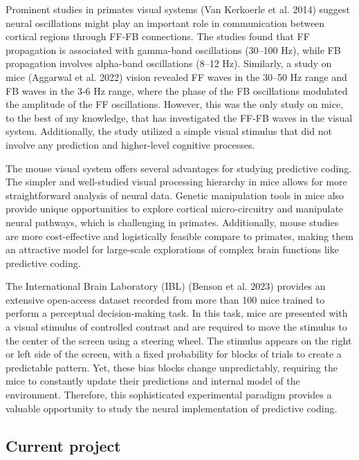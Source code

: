 \documentclass[
  letterpaper,
  DIV=11,
  numbers=noendperiod]{scrartcl}
\begin{document}
Prominent studies in primates visual systems (Van Kerkoerle et al. 2014)
suggest neural oscillations might play an important role in
communication between cortical regions through FF-FB connections. The
studies found that FF propagation is associated with gamma-band
oscillations (30--100 Hz), while FB propagation involves alpha-band
oscillations (8--12 Hz). Similarly, a study on mice (Aggarwal et al.
2022) vision revealed FF waves in the 30--50 Hz range and FB waves in
the 3-6 Hz range, where the phase of the FB oscillations modulated the
amplitude of the FF oscillations. However, this was the only study on
mice, to the best of my knowledge, that has investigated the FF-FB waves
in the visual system. Additionally, the study utilized a simple visual
stimulus that did not involve any prediction and higher-level cognitive
processes.

The mouse visual system offers several advantages for studying
predictive coding. The simpler and well-studied visual processing
hierarchy in mice allows for more straightforward analysis of neural
data. Genetic manipulation tools in mice also provide unique
opportunities to explore cortical micro-circuitry and manipulate neural
pathways, which is challenging in primates. Additionally, mouse studies
are more cost-effective and logistically feasible compare to primates,
making them an attractive model for large-scale explorations of complex
brain functions like predictive coding.

The International Brain Laboratory (IBL) (Benson et al. 2023) provides
an extensive open-access dataset recorded from more than 100 mice
trained to perform a perceptual decision-making task. In this task, mice
are presented with a visual stimulus of controlled contrast and are
required to move the stimulus to the center of the screen using a
steering wheel. The stimulus appears on the right or left side of the
screen, with a fixed probability for blocks of trials to create a
predictable pattern. Yet, these bias blocks change unpredictably,
requiring the mice to constantly update their predictions and internal
model of the environment. Therefore, this sophisticated experimental
paradigm provides a valuable opportunity to study the neural
implementation of predictive coding.

\subsection{Current project}\label{current-project}
\end{document}
